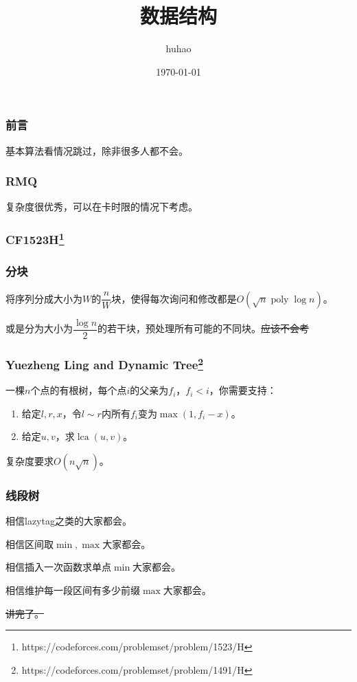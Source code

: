 \documentclass[10pt]{beamer}
\begin{document}
	\title{数据结构}
	\date{\today}
	\author{huhao}
	\maketitle
	\clearpage
	\begin{frame}
		\frametitle{前言}
	
		基本算法看情况跳过，除非很多人都不会。
	
	\end{frame}
	\clearpage
	\begin{frame}
		\frametitle{RMQ}
	
		复杂度很优秀，可以在卡时限的情况下考虑。
	
	\end{frame}
	\clearpage
	\begin{frame}
		\frametitle{CF1523H\footnote{https://codeforces.com/problemset/problem/1523/H}}
	
	\end{frame}
	\clearpage
	\begin{frame}
		\frametitle{分块}

		将序列分成大小为$W$的$\dfrac nW$块，使得每次询问和修改都是$O(\sqrt n\operatorname{poly} \log n)$。

		或是分为大小为$\dfrac{\log n}{2}$的若干块，预处理所有可能的不同块。\sout{应该不会考}
	
	\end{frame}
	\clearpage
	\begin{frame}
		\frametitle{Yuezheng Ling and Dynamic Tree\footnote{https://codeforces.com/problemset/problem/1491/H}}
	
		一棵$n$个点的有根树，每个点$i$的父亲为$f_i$，$f_i<i$，你需要支持：

		\begin{enumerate}
			\item 给定$l,r,x$，令$l\sim r$内所有$f_i$变为$\max(1,f_i-x)$。
			\item 给定$u,v$，求$\operatorname{lca}(u,v)$。
		\end{enumerate}

		复杂度要求$O(n\sqrt n)$。
	
	\end{frame}
	\clearpage
	\begin{frame}
		\frametitle{线段树}
	
		相信lazytag之类的大家都会。

		相信区间取$\min,\max$大家都会。

		相信插入一次函数求单点$\min$大家都会。

		相信维护每一段区间有多少前缀$\max$大家都会。

		\sout{讲完了。}
	
	\end{frame}
\end{document}
